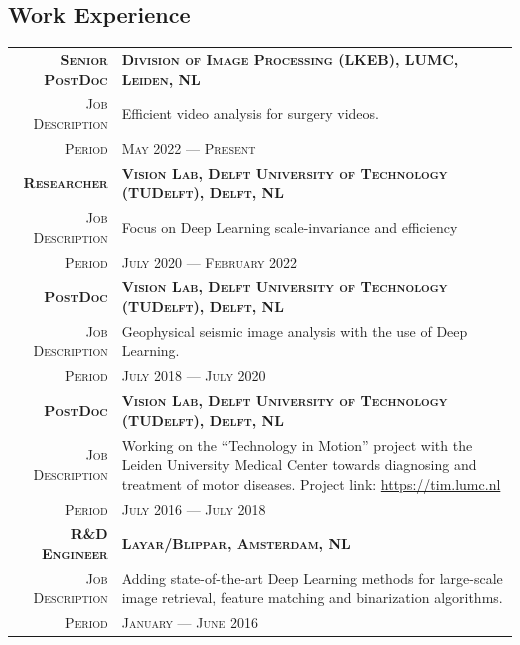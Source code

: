 \documentclass[a4paper, oneside, final]{scrartcl}
\newcommand{\gray}{\rowcolor[gray]{.90}}
\begin{document}
\begin{center}
		\section{Work Experience}
		\begin{tabular}{r@{\hskip 0.3in}p{12.3cm}}
			\gray \textsc{\textbf{Senior PostDoc}} & \textsc{\textbf{Division of Image Processing (LKEB), LUMC, Leiden, NL}}\\
			\textsc{Job Description}            & Efficient video analysis for surgery videos.\\ 
			\textsc{Period}                     & \textsc{May 2022 --- Present} 
            \vspace{5px}\\
			\gray \textsc{\textbf{Researcher}} & \textsc{\textbf{Vision Lab, Delft University of Technology (TUDelft), Delft, NL}}\\
			\textsc{Job Description}            & Focus on Deep Learning scale-invariance and efficiency\\
			\textsc{Period}                     & \textsc{July 2020 --- February 2022} 
            \vspace{5px}\\
			\gray \textsc{\textbf{PostDoc}}     & \textsc{\textbf{Vision Lab, Delft University of Technology (TUDelft), Delft, NL}}\\
			\textsc{Job Description}            & Geophysical seismic image analysis with the use of Deep Learning. \\
			\textsc{Period}                     & \textsc{July 2018 --- July 2020} 
            \vspace{5px}\\
			\gray \textsc{\textbf{PostDoc}}     & \textsc{\textbf{Vision Lab, Delft University of Technology (TUDelft), Delft, NL}}\\
			\textsc{Job Description}            & Working on the ``Technology in Motion'' project with the Leiden University Medical Center 
				towards diagnosing and treatment of motor diseases.
				Project link: \href{https://tim.lumc.nl}{https://tim.lumc.nl}\\
			\textsc{Period}                     & \textsc{July 2016 --- July 2018} 
            \vspace{5px}\\
			\gray \textsc{\textbf{R\&D Engineer}}   & \textsc{\textbf{Layar\slash Blippar, Amsterdam, NL}}\\
			\textsc{Job Description}                &  Adding state-of-the-art Deep Learning methods for large-scale image retrieval, 
				feature matching and binarization algorithms.\\
			\textsc{Period}                         & \textsc{January --- June 2016} 
		\end{tabular}


\end{center}
\end{document}
